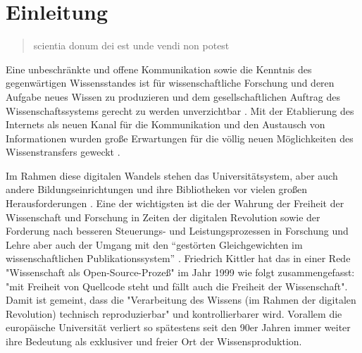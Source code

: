 \chapter{Einleitung} 

\begin{quote}
scientia donum dei est unde vendi non potest
\end{quote}Eine unbeschränkte und offene Kommunikation sowie die Kenntnis des gegenwärtigen Wissensstandes ist für wissenschaftliche Forschung und deren Aufgabe neues Wissen zu produzieren und dem gesellschaftlichen Auftrag des Wissenschaftssystems gerecht zu werden unverzichtbar \cite{Hanekop_2014} \cite{glaeser2006} \cite{gibbons_1994}\cite{Luhmann1998}. Mit der Etablierung des Internets als neuen Kanal für die Kommunikation und den Austausch von Informationen wurden große Erwartungen für die völlig neuen Möglichkeiten des Wissenstransfers geweckt \cite{Hanekop_2014} \cite{Goodrum_2001} \cite{Lawrence_1999}. 

Im Rahmen diese digitalen Wandels stehen das Universitätsystem, aber auch andere Bildungseinrichtungen und ihre Bibliotheken vor vielen großen Herausforderungen \cite{Harter2006} \cite{Gu_don_2004} \cite{osterloh2008anreize}. Eine der wichtigsten ist die der Wahrung der Freiheit der Wissenschaft und Forschung in Zeiten der digitalen Revolution sowie der Forderung nach besseren Steuerungs- und Leistungsprozessen in Forschung und Lehre \cite{Adler_2009} \cite{gibbons_1994} aber auch der Umgang mit den “gestörten Gleichgewichten im wissenschaftlichen Publikationssystem” \cite{cite:0}. Friedrich Kittler hat das in einer Rede "Wissenschaft als Open-Source-Prozeß" im Jahr 1999 wie folgt zusammengefasst: "mit Freiheit von Quellcode steht und fällt auch die Freiheit der Wissenschaft". Damit ist gemeint, dass die "Verarbeitung des Wissens (im Rahmen der digitalen Revolution) technisch reproduzierbar" \cite{cite:1} und kontrollierbarer wird. Vorallem die europäische Universität verliert so spätestens seit den 90er Jahren immer weiter ihre Bedeutung als exklusiver und freier Ort der Wissensproduktion.

